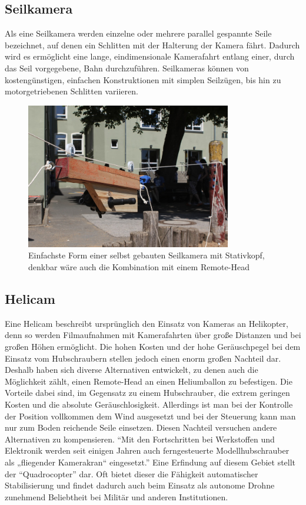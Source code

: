 \documentclass[a4paper, 12pt, bibtotocnumbered, liststotocnumbered]{scrartcl}
\begin{document}
	\subsection{Seilkamera}
	Als eine Seilkamera werden einzelne oder mehrere parallel gespannte Seile bezeichnet, auf denen ein Schlitten mit der Halterung der Kamera fährt. Dadurch wird es ermöglicht eine lange, eindimensionale Kamerafahrt entlang einer, durch das Seil vorgegebene, Bahn durchzuführen. Seilkameras können von kostengünstigen, einfachen Konstruktionen mit simplen Seilzügen, bis hin zu motorgetriebenen Schlitten variieren.

	\begin{figure}[htb]
		\centering
		\includegraphics[width=0.8\textwidth]{Bilder/Seilkamera}
		\caption{Einfachste Form einer selbst gebauten Seilkamera mit Stativkopf, denkbar wäre auch die Kombination mit einem Remote-Head}
	\end{figure}

	\subsection{Helicam}
	Eine Helicam beschreibt ursprünglich den Einsatz von Kameras an Helikopter, denn so werden Filmaufnahmen mit Kamerafahrten über große Distanzen und bei großen Höhen ermöglicht. Die hohen Kosten und der hohe Geräuschpegel bei dem Einsatz vom Hubschraubern stellen jedoch einen enorm großen Nachteil dar. Deshalb haben sich diverse Alternativen entwickelt, zu denen auch die Möglichkeit zählt, einen Remote-Head an einen Heliumballon zu befestigen. Die Vorteile dabei sind, im Gegensatz zu einem Hubschrauber, die extrem geringen Kosten und die absolute Geräuschlosigkeit. Allerdings ist man bei der Kontrolle der Position vollkommen dem Wind ausgesetzt und bei der Steuerung kann man nur zum Boden reichende Seile einsetzen. Diesen Nachteil versuchen andere Alternativen zu kompensieren. “Mit den Fortschritten bei Werkstoffen und Elektronik werden seit einigen Jahren auch ferngesteuerte Modellhubschrauber als „fliegender Kamerakran“ eingesetzt.”\cite{wikipedia-kamerakran} Eine Erfindung auf diesem Gebiet stellt der “Quadrocopter” dar. Oft bietet dieser die Fähigkeit automatischer Stabilisierung und findet dadurch auch beim Einsatz als autonome Drohne zunehmend Beliebtheit bei Militär und anderen Institutionen.
\end{document}
